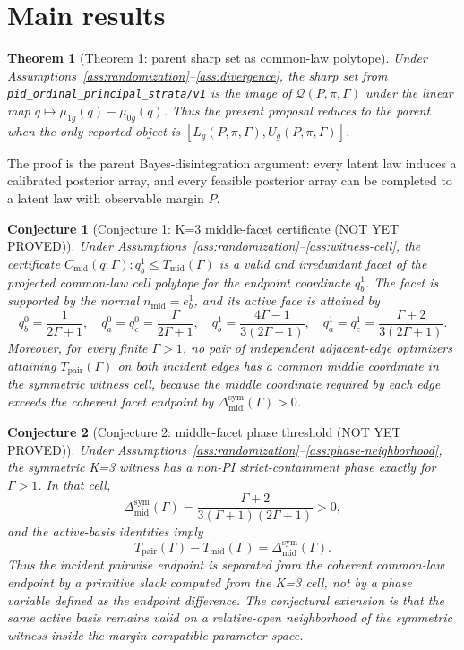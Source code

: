 \documentclass[11pt]{article}
\theoremstyle{definition}
\theoremstyle{plain}
\newtheorem{theorem}{Theorem}
\newtheorem{conjecture}{Conjecture}
\theoremstyle{remark}
\begin{document}
\section{Main results}
\begin{theorem}[Theorem 1: parent sharp set as common-law polytope]\label{thm:parent-reduction}
Under Assumptions~\ref{ass:randomization}--\ref{ass:divergence}, the sharp set from \texttt{pid\_ordinal\_principal\_strata/v1} is the image of \(\mathcal Q(P,\pi,\Gamma)\) under the linear map \(q\mapsto\mu_{1g}(q)-\mu_{0g}(q)\).  Thus the present proposal reduces to the parent when the only reported object is \([L_g(P,\pi,\Gamma),U_g(P,\pi,\Gamma)]\).
\end{theorem}
The proof is the parent Bayes-disintegration argument: every latent law induces a calibrated posterior array, and every feasible posterior array can be completed to a latent law with observable margin \(P\).

\begin{conjecture}[Conjecture 1: K=3 middle-facet certificate (NOT YET PROVED)]\label{conj:middle-facet}
Under Assumptions~\ref{ass:randomization}--\ref{ass:witness-cell}, the certificate \(C_{\mathrm{mid}}(q;\Gamma):q_b^1\le T_{\mathrm{mid}}(\Gamma)\) is a valid and irredundant facet of the projected common-law cell polytope for the endpoint coordinate \(q_b^1\).  The facet is supported by the normal \(n_{\mathrm{mid}}=e_b^1\), and its active face is attained by
\[
  q_b^0=\frac{1}{2\Gamma+1},\quad
  q_a^0=q_c^0=\frac{\Gamma}{2\Gamma+1},\quad
  q_b^1=\frac{4\Gamma-1}{3(2\Gamma+1)},\quad
  q_a^1=q_c^1=\frac{\Gamma+2}{3(2\Gamma+1)}.
\]
Moreover, for every finite \(\Gamma>1\), no pair of independent adjacent-edge optimizers attaining \(T_{\mathrm{pair}}(\Gamma)\) on both incident edges has a common middle coordinate in the symmetric witness cell, because the middle coordinate required by each edge exceeds the coherent facet endpoint by \(\Delta_{\mathrm{mid}}^{\mathrm{sym}}(\Gamma)>0\).
\end{conjecture}

\begin{conjecture}[Conjecture 2: middle-facet phase threshold (NOT YET PROVED)]\label{conj:phase}
Under Assumptions~\ref{ass:randomization}--\ref{ass:phase-neighborhood}, the symmetric K=3 witness has a non-PI strict-containment phase exactly for \(\Gamma>1\).  In that cell,
\[
  \Delta_{\mathrm{mid}}^{\mathrm{sym}}(\Gamma)
  =\frac{\Gamma+2}{3(\Gamma+1)(2\Gamma+1)}>0,
\]
and the active-basis identities imply
\[
  T_{\mathrm{pair}}(\Gamma)-T_{\mathrm{mid}}(\Gamma)
  =
  \Delta_{\mathrm{mid}}^{\mathrm{sym}}(\Gamma).
\]
Thus the incident pairwise endpoint is separated from the coherent common-law endpoint by a primitive slack computed from the K=3 cell, not by a phase variable defined as the endpoint difference.  The conjectural extension is that the same active basis remains valid on a relative-open neighborhood of the symmetric witness inside the margin-compatible parameter space.
\end{conjecture}
\end{document}
